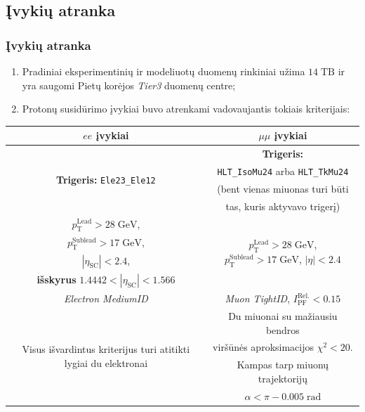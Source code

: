 \documentclass[xcolor=dvipsnames]{beamer}
\newcommand{\ttt}[1]{\texttt{#1}}
\newcommand{\ee}{\mathit{ee}}
\newcommand{\mumu}{\mu\mu}
\begin{document}
\begin{frame}
	\section{Įvykių atranka}
	\frametitle{Įvykių atranka}
	\begin{enumerate}
		\item Pradiniai eksperimentinių ir modeliuotų duomenų rinkiniai užima $14\; \mathrm{TB}$ ir yra saugomi
		Pietų korėjos \textit{Tier3} duomenų centre;
		\item Protonų susidūrimo įvykiai buvo atrenkami vadovaujantis tokiais kriterijais:
	\end{enumerate}
	\vspace{-0.2cm}
	\begin{center}
		\footnotesize
		\begin{tabular}{|c|c|}
			\hline
			$\ee$ įvykiai & $\mumu$ įvykiai \\
			\hline\hline
			\multirow{4}{6em}{\centering\textbf{Trigeris:} \ttt{Ele23\_Ele12}} & \textbf{Trigeris:} \\
			& \ttt{HLT\_IsoMu24} arba \ttt{HLT\_TkMu24} \\
			& (bent vienas miuonas turi būti \\
			& tas, kuris aktyvavo trigerį) \\
			\hline
			
			$\mathit{p}_{\mathrm{T}}^{\mathrm{Lead}} > 28 \; \mathrm{GeV}$, &
				\multirow{4}{10em}{\centering$\mathit{p}_{\mathrm{T}}^{\mathrm{Lead}} > 28 \; \mathrm{GeV}$,
				$\mathit{p}_{\mathrm{T}}^{\mathrm{Sublead}} > 17 \; \mathrm{GeV}$,
				$|\eta| < 2.4$} \\
			$\mathit{p}_{\mathrm{T}}^{\mathrm{Sublead}} > 17 \; \mathrm{GeV}$, & \\
			$|\eta_{\mathrm{SC}}| < 2.4$, & \\
			\textbf{išskyrus} $1.4442 < |\eta_{\mathrm{SC}}| < 1.566$ & \\
			\hline
			\textit{Electron MediumID} & \textit{Muon TightID}, $\mathit{I}_{\mathrm{PF}}^{\mathrm{Rel.}} < 0.15$  \\
			\hline
			\multirow{4}{13em}{\centering Visus išvardintus kriterijus turi atitikti lygiai du elektronai} & Du miuonai su mažiausiu bendros \\
			& viršūnės aproksimacijos $\chi^2 < 20$. \\
			& Kampas tarp miuonų trajektorijų \\
			& $\alpha < \pi - 0.005 \; \mathrm{rad}$ \\
			\hline
		\end{tabular}
	\end{center}
\end{frame}
\end{document}
